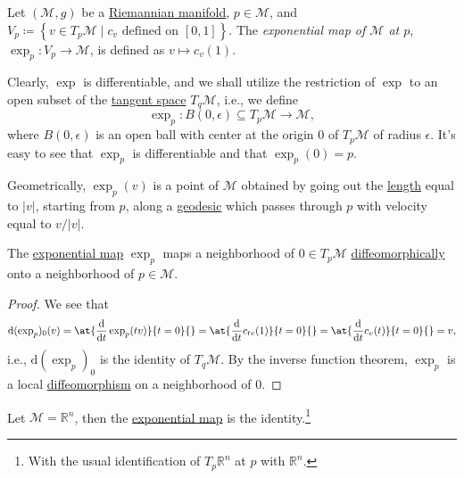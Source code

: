 \begin{definition}\label{def:exponential-map}
	Let \((\mathcal{M} , g)\) be a \hyperref[def:Riemannian-manifold]{Riemannian manifold}, \(p\in \mathcal{M} \), and \(V_p \coloneqq \left\{ v\in T_p \mathcal{M} \mid c_v \text{ defined on } [0, 1] \right\}\). The \emph{exponential map of \(\mathcal{M} \) at \(p\)}, \(\exp_p \colon V_p \to \mathcal{M} \), is defined as \(v \mapsto c_v(1)\).
\end{definition}

Clearly, \(\exp \) is differentiable, and we shall utilize the restriction of \(\exp \) to an open subset of the \hyperref[def:tangent-space]{tangent space} \(T_q \mathcal{M} \), i.e., we define
\[
	\exp _p\colon B(0, \epsilon ) \subseteq T_p \mathcal{M} \to \mathcal{M} ,
\]
where \(B(0, \epsilon ) \) is an open ball with center at the origin \(0\) of \(T_p \mathcal{M} \) of radius \(\epsilon \). It's easy to see that \(\exp _p\) is differentiable and that \(\exp _p(0) = p\).

\begin{intuition}
	Geometrically, \(\exp _p(v)\) is a point of \(\mathcal{M} \) obtained by going out the \hyperref[def:length]{length} equal to \(\vert v \vert \), starting from \(p\), along a \hyperref[def:geodesic]{geodesic} which passes through \(p\) with velocity equal to \(v / \vert v \vert \).
\end{intuition}

\begin{proposition}
	The \hyperref[def:exponential-map]{exponential map} \(\exp _p\) maps a neighborhood of \(0\in T_p \mathcal{M} \) \hyperref[def:diffeomorphic]{diffeomorphically} onto a neighborhood of \(p\in \mathcal{M} \).
\end{proposition}
\begin{proof}
	We see that
	\[
		\mathrm{d} (\exp _p)_0(v)
		= \at{\frac{\mathrm{d}}{\mathrm{d}t} \exp _p(tv)}{t=0}{}
		= \at{\frac{\mathrm{d}}{\mathrm{d}t} c_{tv}(1)}{t=0}{}
		= \at{\frac{\mathrm{d}}{\mathrm{d}t} c_{v}(t)}{t=0}{}
		= v,
	\]
	i.e., \(\mathrm{d} (\exp _p)_0\) is the identity of \(T_q \mathcal{M} \). By the inverse function theorem, \(\exp _p\) is a local \hyperref[def:diffeomorphism]{diffeomorphism} on a neighborhood of \(0\).
\end{proof}

\begin{eg}
	Let \(\mathcal{M} = \mathbb{R} ^n\), then the \hyperref[def:exponential-map]{exponential map} is the identity.\footnote{With the usual identification of \(T_p \mathbb{R} ^n\) at \(p\) with \(\mathbb{R} ^n\).}
\end{eg}

